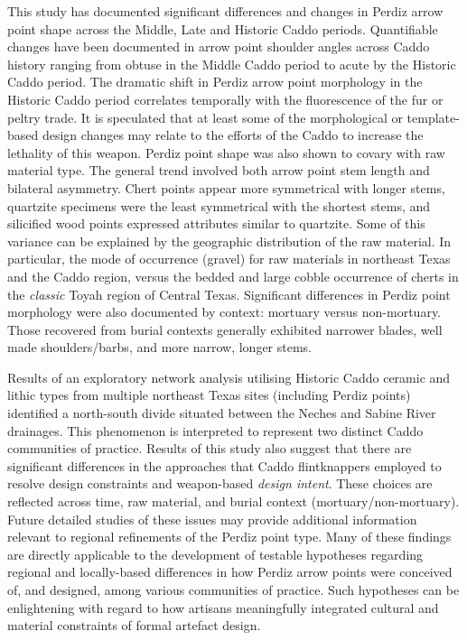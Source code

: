 \documentclass[review]{elsarticle}
\begin{document}
This study has documented significant differences and changes in Perdiz arrow point shape across the Middle, Late and Historic Caddo periods. Quantifiable changes have been documented in arrow point shoulder angles across Caddo history ranging from obtuse in the Middle Caddo period to acute by the Historic Caddo period. The dramatic shift in Perdiz arrow point morphology in the Historic Caddo period correlates temporally with the fluorescence of the fur or peltry trade. It is speculated that at least some of the morphological or template-based design changes may relate to the efforts of the Caddo to increase the lethality of this weapon. Perdiz point shape was also shown to covary with raw material type. The general trend involved both arrow point stem length and bilateral asymmetry. Chert points appear more symmetrical with longer stems, quartzite specimens were the least symmetrical with the shortest stems, and silicified wood points expressed attributes similar to quartzite. Some of this variance can be explained by the geographic distribution of the raw material. In particular, the mode of occurrence (gravel) for raw materials in northeast Texas and the Caddo region, versus the bedded and large cobble occurrence of cherts in the \textit{classic} Toyah region of Central Texas. Significant differences in Perdiz point morphology were also documented by context: mortuary versus non-mortuary. Those recovered from burial contexts generally exhibited narrower blades, well made shoulders/barbs, and more narrow, longer stems.

Results of an exploratory network analysis utilising Historic Caddo ceramic and lithic types from multiple northeast Texas sites (including Perdiz points) identified a north-south divide situated between the Neches and Sabine River drainages. This phenomenon is interpreted to represent two distinct Caddo communities of practice. Results of this study also suggest that there are significant differences in the approaches that Caddo flintknappers employed to resolve design constraints and weapon-based \textit{design intent}. These choices are reflected across time, raw material, and burial context (mortuary/non-mortuary). Future detailed studies of these issues may provide additional information relevant to regional refinements of the Perdiz point type. Many of these findings are directly applicable to the development of testable hypotheses regarding regional and locally-based differences in how Perdiz arrow points were conceived of, and designed, among various communities of practice. Such hypotheses can be enlightening with regard to how artisans meaningfully integrated cultural and material constraints of formal artefact design.
\end{document}
